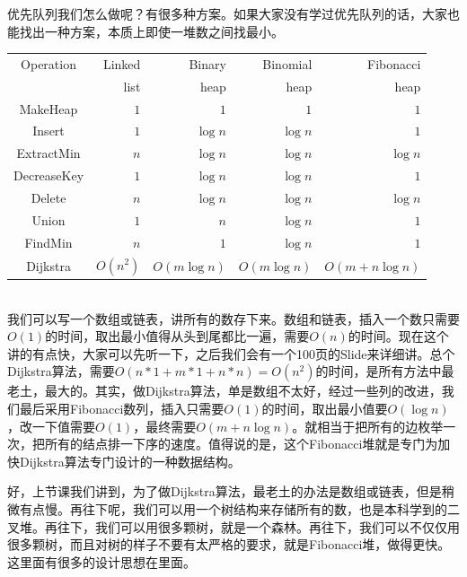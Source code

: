 	 优先队列我们怎么做呢？有很多种方案。如果大家没有学过优先队列的话，大家也能找出一种方案，本质上即使一堆数之间找最小。\\
  	\begin{tabular}{crrrr}
  		\hline  \hline
  		Operation & Linked  & Binary  & Binomial  & Fibonacci  \\
  		&  list &  heap &  heap & heap \\
  		\hline
  		{\sc MakeHeap} & $ 1 $ &  $1$  & $ 1 $ & $1$  \\ 
  		{\sc Insert} & $ 1 $ &  $\log n$  & $ \log n $ & $1$  \\ 
  		{\sc ExtractMin} & $ n $ &  $\log n$  & $ \log n  $ & $ \log n $  \\ 
  		{\sc DecreaseKey} & $ 1 $ &  $\log n$  & $ \log n $ & $1$  \\ 
  		{\sc Delete} & $ n $ &  $\log n$  & $ \log n $ & $\log n$  \\ 
  		{\sc Union} & $ 1 $ &  $ n $  & $ \log n $ & $1$  \\ 
  		{\sc FindMin} & $ n $ &  $1$  & $ \log n $ & $1$  \\ 
  		\hline 
  		{\sc Dijkstra} & $ O(n^2) $ &  $ O(m \log n) $  & $ O( m \log n ) $ & $ O( m + n \log n) $  \\ 
  		\hline \hline 
  	\end{tabular} \\
  	我们可以写一个数组或链表，讲所有的数存下来。数组和链表，插入一个数只需要$O(1)$的时间，取出最小值得从头到尾都比一遍，需要$O(n)$的时间。现在这个讲的有点快，大家可以先听一下，之后我们会有一个100页的Slide来详细讲。总个Dijkstra算法，需要$O(n*1+m*1+n*n)=O(n^2)$的时间，是所有方法中最老土，最大的。其实，做Dijkstra算法，单是数组不太好，经过一些列的改进，我们最后采用Fibonacci数列，插入只需要$O(1)$的时间，取出最小值要$O(\log n)$，改一下值需要$O(1)$，最终需要$O(m+n\log n)$。就相当于把所有的边枚举一次，把所有的结点排一下序的速度。值得说的是，这个Fibonacci堆就是专门为加快Dijkstra算法专门设计的一种数据结构。
  	
  	好，上节课我们讲到，为了做Dijkstra算法，最老土的办法是数组或链表，但是稍微有点慢。再往下呢，我们可以用一个树结构来存储所有的数，也是本科学到的二叉堆。再往下，我们可以用很多颗树，就是一个森林。再往下，我们可以不仅仅用很多颗树，而且对树的样子不要有太严格的要求，就是Fibonacci堆，做得更快。这里面有很多的设计思想在里面。
  	
